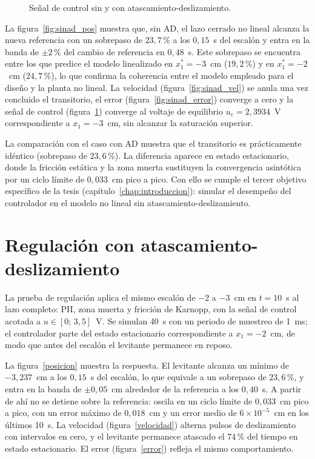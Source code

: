 \begin{figure}[ht]
    \centering
    
    \caption[Sin AD: señal de control]{Señal de control sin y con atascamiento-deslizamiento.}
    \label{fig:sinad_ctrl}
\end{figure}

La figura~\ref{fig:sinad_pos} muestra que, sin AD, el lazo cerrado no lineal alcanza la nueva referencia con un sobrepaso de $23{,}7$\,\% a los $0{,}15$~s del escalón y entra en la banda de $\pm 2$\,\% del cambio de referencia en $0{,}48$~s. Este sobrepaso se encuentra entre los que predice el modelo linealizado en $x_1^*=-3$~cm ($19{,}2$\,\%) y en $x_1^*=-2$~cm ($24{,}7$\,\%), lo que confirma la coherencia entre el modelo empleado para el diseño y la planta no lineal. La velocidad (figura~\ref{fig:sinad_vel}) se anula una vez concluido el transitorio, el error (figura~\ref{fig:sinad_error}) converge a cero y la señal de control (figura~\ref{fig:sinad_ctrl}) converge al voltaje de equilibrio $u_e=2{,}3934$~V correspondiente a $x_1=-3$~cm, sin alcanzar la saturación superior.

La comparación con el caso con AD muestra que el transitorio es prácticamente idéntico (sobrepaso de $23{,}6$\,\%). La diferencia aparece en estado estacionario, donde la fricción estática y la zona muerta sustituyen la convergencia asintótica por un ciclo límite de $0{,}033$~cm pico a pico. Con ello se cumple el tercer objetivo específico de la tesis (capítulo~\ref{chap:introduccion}): simular el desempeño del controlador en el modelo no lineal sin atascamiento-deslizamiento.

\FloatBarrier

\section{Regulación con atascamiento-deslizamiento}
\label{sec:regulacion}

La prueba de regulación aplica el mismo escalón de $-2$ a $-3$~cm en $t=10$~s al lazo completo: PII, zona muerta y fricción de Karnopp, con la señal de control acotada a $u\in[0;\,3{,}5]$~V. Se simulan 40~s con un periodo de muestreo de 1~ms; el controlador parte del estado estacionario correspondiente a $x_1=-2$~cm, de modo que antes del escalón el levitante permanece en reposo.

La figura~\ref{posicion} muestra la respuesta. El levitante alcanza un mínimo de $-3{,}237$~cm a los $0{,}15$~s del escalón, lo que equivale a un sobrepaso de $23{,}6$\,\%, y entra en la banda de $\pm0{,}05$~cm alrededor de la referencia a los $0{,}40$~s. A partir de ahí no se detiene sobre la referencia: oscila en un ciclo límite de $0{,}033$~cm pico a pico, con un error máximo de $0{,}018$~cm y un error medio de $6\times10^{-5}$~cm en los últimos 10~s. La velocidad (figura~\ref{velocidad}) alterna pulsos de deslizamiento con intervalos en cero, y el levitante permanece atascado el 74\,\% del tiempo en estado estacionario. El error (figura~\ref{error}) refleja el mismo comportamiento.

